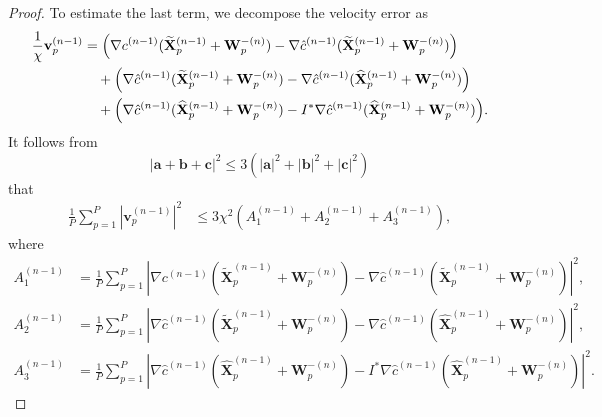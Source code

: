 \documentclass[review,onefignum,onetabnum]{siamart250211}
\begin{document}
\begin{proof}
To estimate the last term, we decompose the velocity error as
\begin{equation}
\begin{aligned}
\frac{1}{\chi}\mathbf{v}_p^{(n-1)}
&=
\Bigl(
\nabla c^{(n-1)}(\widetilde{\mathbf{X}}_p^{(n-1)}+\mathbf{W}_p^{-(n)})
-
\nabla\hat{c}^{(n-1)}
(\widetilde{\mathbf{X}}_p^{(n-1)}+\mathbf{W}_p^{-(n)})
\Bigr)\\
&\quad+
\Bigl(
\nabla\hat{c}^{(n-1)}
(\widetilde{\mathbf{X}}_p^{(n-1)}+\mathbf{W}_p^{-(n)})
-
\nabla\hat{c}^{(n-1)}
(\widehat{\mathbf{X}}_p^{(n-1)}+\mathbf{W}_p^{-(n)})
\Bigr)\\
&\quad+
\Bigl(
\nabla\hat{c}^{(n-1)}
(\widehat{\mathbf{X}}_p^{(n-1)}+\mathbf{W}_p^{-(n)})
-
I^*\nabla\hat{c}^{(n-1)}
(\widehat{\mathbf{X}}_p^{(n-1)}+\mathbf{W}_p^{-(n)})
\Bigr).
\end{aligned}
\end{equation}
It follows from
\[
|\mathbf{a}+\mathbf{b}+\mathbf{c}|^2
\leq
3\left(|\mathbf{a}|^2+|\mathbf{b}|^2+|\mathbf{c}|^2\right)
\]
that
\begin{equation}
\label{eq:velocity_error_decomposition}
\begin{aligned}
\frac{1}{P}\sum_{p=1}^{P}
|\mathbf{v}_p^{(n-1)}|^2
&\leq 3\chi^2
\left(
A_1^{(n-1)}+A_2^{(n-1)}+A_3^{(n-1)}
\right),
\end{aligned}
\end{equation}
where
\begin{equation}
\begin{aligned}
A_1^{(n-1)}
&=
\frac{1}{P}\sum_{p=1}^{P}
\left|
\nabla c^{(n-1)}(\widetilde{\mathbf{X}}_p^{(n-1)}+\mathbf{W}_p^{-(n)})
-
\nabla\hat{c}^{(n-1)}
(\widetilde{\mathbf{X}}_p^{(n-1)}+\mathbf{W}_p^{-(n)})
\right|^2,\\
A_2^{(n-1)}
&=
\frac{1}{P}\sum_{p=1}^{P}
\left|
\nabla\hat{c}^{(n-1)}
(\widetilde{\mathbf{X}}_p^{(n-1)}+\mathbf{W}_p^{-(n)})
-
\nabla\hat{c}^{(n-1)}
(\widehat{\mathbf{X}}_p^{(n-1)}+\mathbf{W}_p^{-(n)})
\right|^2,\\
A_3^{(n-1)}
&=
\frac{1}{P}\sum_{p=1}^{P}
\left|
\nabla\hat{c}^{(n-1)}
(\widehat{\mathbf{X}}_p^{(n-1)}+\mathbf{W}_p^{-(n)})
-
I^*\nabla\hat{c}^{(n-1)}
(\widehat{\mathbf{X}}_p^{(n-1)}+\mathbf{W}_p^{-(n)})
\right|^2.
\end{aligned}
\end{equation}


\end{proof}
\end{document}
